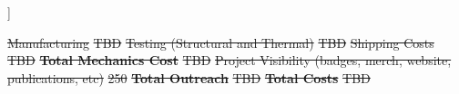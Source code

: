 ]\documentclass[a4paper,12pt,twoside]{article}
\providecommand{\DIFdeltex}[1]{{\protect\color{red}\sout{#1}}}                      %
\providecommand{\DIFaddbegin}{} %
\providecommand{\DIFdelend}{} %
\providecommand{\DIFdel}[1]{\texorpdfstring{\DIFdeltex{#1}}{}} %
\newcommand{\DIFaddincludegraphics}[2][]{{\color{blue}\fbox{\DIFOincludegraphics[#1]{#2}}}} %
\DeclareRobustCommand{\DIFaddbegin}{\DIFOaddbegin \let\includegraphics\DIFaddincludegraphics} %
\DeclareRobustCommand{\DIFdelend}{\DIFOaddend \let\includegraphics\DIFOincludegraphics} %
\begin{document}
\DIFdel{Manufacturing }%
\DIFdel{TBD }%
\DIFdel{Testing (Structural and Thermal) }%
\DIFdel{TBD }%
\DIFdel{Shipping Costs }%
\DIFdel{TBD }%
\textbf{\DIFdel{Total Mechanics Cost}} %
\DIFdel{TBD }%
\DIFdel{Project Visibility (badges, merch, website, publications, etc)}%
\DIFdel{250}%
\textbf{\DIFdel{Total Outreach}} %
\DIFdel{TBD }%
\textbf{\DIFdel{Total Costs}} %
\DIFdel{TBD }%
\DIFdelend %
\DIFaddbegin 
\end{document}

